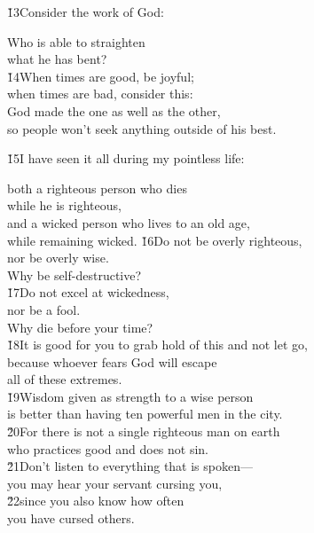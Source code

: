 \v{13}Consider the work of God:

\begin{poetry}
\poeml Who is able to straighten \\
\poemll    what he has bent? \\
\poeml \v{14}When times are good, be joyful; \\
\poemll    when times are bad, consider this: \\
\poeml God made the one as well as the other, \\
\poemll    so people won't seek anything outside of his best.
\end{poetry}

\v{15}I have seen it all during my pointless life:

\begin{poetry}
\poeml both a righteous person who dies \\
\poemll    while he is righteous, \\
\poeml and a wicked person who lives to an old age, \\
\poemll    while remaining wicked.
\poeml \v{16}Do not be overly righteous, \\
\poemll    nor be overly wise. \\
\poemlll       Why be self-destructive? \\
\poeml \v{17}Do not excel at wickedness, \\
\poemll    nor be a fool. \\
\poemlll       Why die before your time? \\
\poeml \v{18}It is good for you to grab hold of this and not let go, \\
\poemll    because whoever fears God will escape \\
\poemlll       all of these extremes. \\
\poeml \v{19}Wisdom given as strength to a wise person \\
\poemll    is better than having ten powerful men in the city. \\
\poeml \v{20}For there is not a single righteous man on earth \\
\poemll    who practices good and does not sin. \\
\poeml \v{21}Don't listen to everything that is spoken--- \\
\poemll    you may hear your servant cursing you, \\
\poeml \v{22}since you also know how often \\
\poemll    you have cursed others.
\end{poetry}


